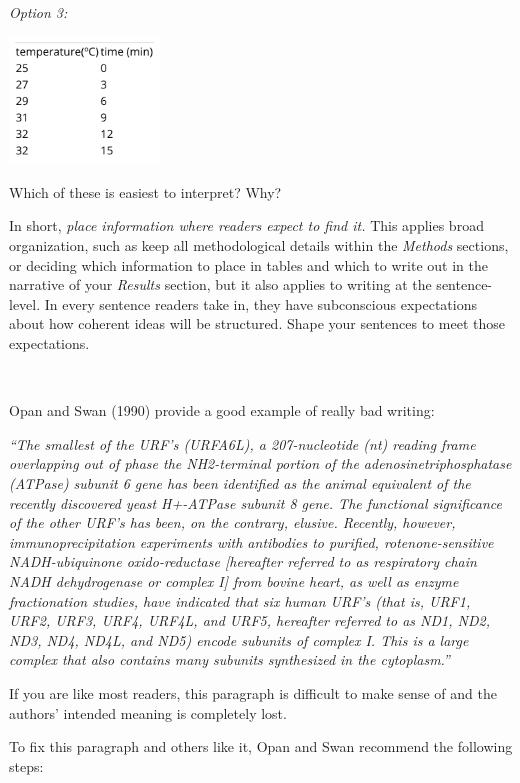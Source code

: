 \documentclass[
]{book}
\begin{document}
\emph{Option 3:}

\includegraphics[width=0.3\textwidth,height=\textheight]{img/style-eg2.png}

Which of these is easiest to interpret? Why?

In short, \emph{place information where readers expect to find it.} This applies broad organization, such as keep all methodological details within the \emph{Methods} sections, or deciding which information to place in tables and which to write out in the narrative of your \emph{Results} section, but it also applies to writing at the sentence-level. In every sentence readers take in, they have subconscious expectations about how coherent ideas will be structured. Shape your sentences to meet those expectations.

~

Opan and Swan (1990) provide a good example of really bad writing:

\emph{``The smallest of the URF's (URFA6L), a 207-nucleotide (nt) reading frame overlapping out of phase the NH2-terminal portion of the adenosinetriphosphatase (ATPase) subunit 6 gene has been identified as the animal equivalent of the recently discovered yeast H+-ATPase subunit 8 gene. The functional significance of the other URF's has been, on the contrary, elusive. Recently, however, immunoprecipitation experiments with antibodies to purified, rotenone-sensitive NADH-ubiquinone oxido-reductase {[}hereafter referred to as respiratory chain NADH dehydrogenase or complex I{]} from bovine heart, as well as enzyme fractionation studies, have indicated that six human URF's (that is, URF1, URF2, URF3, URF4, URF4L, and URF5, hereafter referred to as ND1, ND2, ND3, ND4, ND4L, and ND5) encode subunits of complex I. This is a large complex that also contains many subunits synthesized in the cytoplasm.''}

If you are like most readers, this paragraph is difficult to make sense of and the authors' intended meaning is completely lost.

To fix this paragraph and others like it, Opan and Swan recommend the following steps:

~
\end{document}
